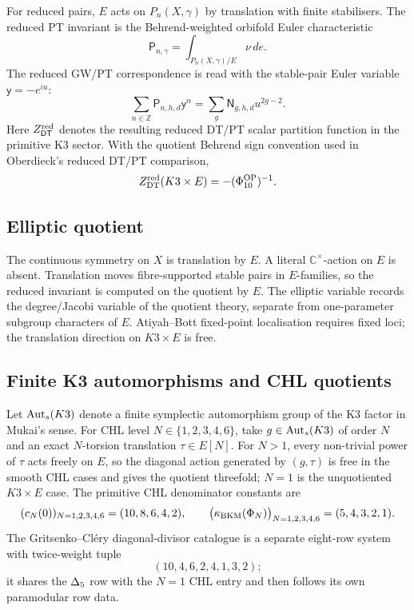 For reduced pairs, \(E\) acts on \(P_n(X,\gamma)\) by translation with
finite stabilisers.  The reduced PT invariant is the Behrend-weighted
orbifold Euler characteristic
\[
  \mathsf P_{n,\gamma}
  =
  \int_{P_n(X,\gamma)/E}\nu\,de .
\]
The reduced GW/PT correspondence is read with the stable-pair Euler
variable \(\mathsf y=-e^{iu}\):
\[
  \sum_{n\in\mathbb Z}\mathsf P_{n,h,d}\mathsf y^n
  =
  \sum_g \mathsf N_{g,h,d}u^{2g-2}.
\]
Here \(Z^{\mathrm{red}}_{\mathsf{DT}}\) denotes the resulting reduced DT/PT scalar
partition function in the primitive K3 sector.  With the quotient
Behrend sign convention used in Oberdieck's reduced DT/PT comparison,
\[
  Z^{\mathrm{red}}_{\mathrm{DT}}(K3\times E)
  = -(\Phi_{10}^{\mathrm{OP}})^{-1}.
\]

\subsection*{Elliptic quotient}

The continuous symmetry on \(X\) is translation by \(E\).  A literal
\(\mathbb C^\times\)-action on \(E\) is absent.  Translation moves
fibre-supported stable pairs in \(E\)-families, so the reduced invariant
is computed on the quotient by \(E\).  The elliptic variable records
the degree/Jacobi variable of the quotient theory, separate from
one-parameter subgroup characters of \(E\).  Atiyah--Bott fixed-point
localisation requires fixed loci; the translation direction on
\(K3\times E\) is free.

\subsection*{Finite K3 automorphisms and CHL quotients}

Let \(\mathrm{Aut}_{s}(K3)\) denote a finite symplectic automorphism group of the
K3 factor in Mukai's sense.  For CHL level \(N\in\{1,2,3,4,6\}\), take
\(g\in\mathrm{Aut}_{s}(K3)\) of order \(N\) and an exact \(N\)-torsion translation
\(\tau\in E[N]\).  For \(N>1\), every non-trivial power of \(\tau\) acts
freely on \(E\), so the diagonal action generated by
\((g,\tau)\) is free in the smooth CHL cases and gives the quotient
threefold; \(N=1\) is the unquotiented \(K3\times E\) case.
The primitive CHL denominator constants are
\[
  (c_N(0))_{N=1,2,3,4,6}=(10,8,6,4,2),
  \qquad
  \bigl(\kappa_{\mathrm{BKM}}(\Phi_N)\bigr)_{N=1,2,3,4,6}=(5,4,3,2,1).
\]
The Gritsenko--Cl\'ery diagonal-divisor catalogue is a separate
eight-row system with twice-weight tuple
\[
  (10,4,6,2,4,1,3,2);
\]
it shares the \(\Delta_5\) row with the \(N=1\) CHL entry and then
follows its own paramodular row data.


